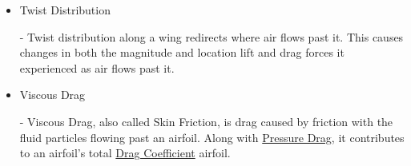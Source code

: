 \documentclass{article}
\begin{document}
\begin{itemize}
	\item \hypertarget{T}{Twist Distribution} - Twist distribution along a wing redirects where air flows past it. This causes changes in both the magnitude and location lift and drag forces it experienced as air flows past it.
	
	\item \hypertarget{VD}{Viscous Drag} - Viscous Drag, also called Skin Friction, is drag caused by friction with the fluid particles flowing past an airfoil. Along with \hyperlink{PD}{Pressure Drag}, it contributes to an airfoil's total \hyperlink{CD}{Drag Coefficient} airfoil.
	
\end{itemize}
\end{document}
